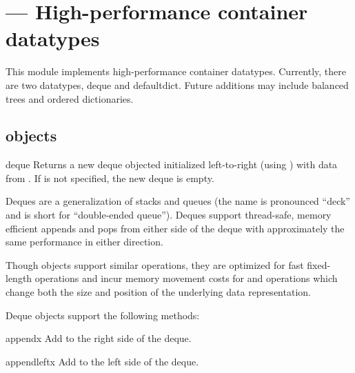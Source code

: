 \section{ ---
         High-performance container datatypes}



This module implements high-performance container datatypes.  Currently,
there are two datatypes, deque and defaultdict.
Future additions may include balanced trees and ordered dictionaries.

\subsection{ objects \label{deque-objects}}

\begin{funcdesc}{deque}{}
  Returns a new deque objected initialized left-to-right (using
  ) with data from .  If 
  is not specified, the new deque is empty.

  Deques are a generalization of stacks and queues (the name is pronounced
  ``deck'' and is short for ``double-ended queue'').  Deques support
  thread-safe, memory efficient appends and pops from either side of the deque
  with approximately the same  performance in either direction.

  Though  objects support similar operations, they are optimized
  for fast fixed-length operations and incur  memory movement costs
  for  and  operations which change both the
  size and position of the underlying data representation.
\end{funcdesc}

Deque objects support the following methods:

\begin{methoddesc}{append}{x}
   Add  to the right side of the deque.
\end{methoddesc}

\begin{methoddesc}{appendleft}{x}
   Add  to the left side of the deque.
\end{methoddesc}

